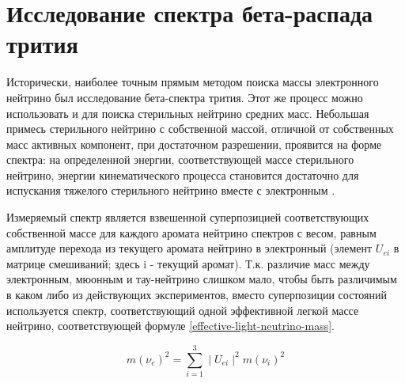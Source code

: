 \documentclass[a4paper,14pt]{extreport}
\begin{document}
\section{Исследование спектра бета-распада трития}

Исторически, наиболее точным прямым методом поиска массы электронного нейтрино был исследование бета-спектра трития. Этот же процесс можно использовать и для поиска стерильных нейтрино средних масс. Небольшая примесь стерильного нейтрино с собственной массой, отличной от собственных масс активных компонент, при достаточном разрешении, проявится на форме спектра: на определенной энергии, соответствующей массе стерильного нейтрино, энергии кинематического процесса становится достаточно для испускания тяжелого стерильного нейтрино вместе с электронным \cite{new-tests-for-and-bounds-on-neutrino-masses-and-lepton-mixing}\cite{role-of-sterile-neutrino-warm-dark-matter-in-rhenium-and-tritium-beta-decays}\cite{signatures-of-extra-dimensional-sterile-neutrinos}\cite{sterile-neutrinos-and-right-handed-currents-in-katrin}.

Измеряемый спектр является взвешенной суперпозицией соответствующих собственной массе для каждого аромата нейтрино спектров с весом, равным амплитуде перехода из текущего аромата нейтрино в электронный (элемент $ U_{e i} $ в матрице смешиваний; здесь i - текущий аромат). Т.к. различие масс между электронным, мюонным и тау-нейтрино слишком мало, чтобы быть различимым в каком либо из действующих экспериментов, вместо суперпозиции состояний используется спектр, соответствующий одной эффективной легкой массе нейтрино, соответствующей формуле \ref{effective-light-neutrino-mass}.

\begin{equation}\label{effective-light-neutrino-mass}
   m(\nu_{e})^2 = \sum_{i=1}^{3} \mid U_{e i} \mid^2m(\nu_{i})^2  
\end{equation}
\end{document}
